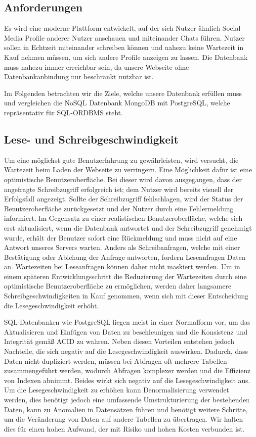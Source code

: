 \subsection{Anforderungen}
Es wird eine moderne Plattform entwickelt, auf der sich Nutzer ähnlich Social Media Profile anderer Nutzer anschauen und miteinander Chats führen. Nutzer sollen in Echtzeit miteinander schreiben können und nahezu keine Wartezeit in Kauf nehmen müssen, um sich andere Profile anzeigen zu lassen. Die Datenbank muss nahezu immer erreichbar sein, da unsere Webseite ohne Datenbankanbindung nur beschränkt nutzbar ist.


Im Folgenden betrachten wir die Ziele, welche unsere Datenbank erfüllen muss und vergleichen die NoSQL Datenbank MongoDB mit PostgreSQL, welche repräsentativ für SQL-ORDBMS steht.

\subsection{Lese- und Schreibgeschwindigkeit}
Um eine möglichst gute Benutzerfahrung zu gewährleisten, wird versucht, die Wartezeit beim Laden der Webseite zu verringern. 
Eine Möglichkeit dafür ist eine optimistische Benutzeroberfläche. Bei dieser wird davon ausgegangen, dass der angefragte Schreibzugriff erfolgreich ist; dem Nutzer wird bereits visuell der Erfolgsfall angezeigt. Sollte der Schreibzugriff fehlschlagen,  wird der Status der Benutzeroberfläche zurückgesetzt und der Nutzer durch eine Fehlermeldung informiert. Im Gegensatz zu einer realistischen Benutzeroberfläche, welche sich erst aktualisiert, wenn die Datenbank antwortet und der Schreibzugriff genehmigt wurde, erhält der Benutzer sofort eine Rückmeldung und muss nicht auf eine Antwort unseres Servers warten.
Anders als Schreibanfragen, welche mit einer Bestätigung oder Ablehung der Anfrage antworten, fordern Leseanfragen Daten an. Wartezeiten bei Leseanfragen können daher nicht maskiert werden.
Um in einem späteren Entwicklungsschritt die Reduzierung der Wartezeiten durch eine optimistische Benutzeroberfläche zu ermöglichen, werden daher langsamere Schreibgeschwindigkeiten in Kauf genommen, wenn sich mit dieser Entscheidung die Lesegeschwindigkeit erhöht.

SQL-Datenbanken wie PostgreSQL liegen meist in einer Normalform vor, um das Aktualisieren und Einfügen von Daten zu beschleunigen und die Konsistenz und Integrität gemäß ACID zu wahren. Neben diesen Vorteilen entstehen jedoch Nachteile, die sich negativ auf die Lesegeschwindigkeit auswirken. Dadurch, dass Daten nicht dupliziert werden, müssen bei Abfragen oft mehrere Tabellen zusammengeführt werden, wodurch Abfragen komplexer werden und die Effizienz von Indexen abnimmt. Beides wirkt sich negativ auf die Lesegeschwindigkeit aus. Um die Lesegeschwindigkeit zu erhöhen kann Denormalisierung verwendet werden, dies benötigt jedoch eine umfassende Umstrukturierung der bestehenden Daten, kann zu Anomalien in Datensätzen führen und benötigt weitere Schritte, um die Veränderung von Daten auf andere Tabellen zu übertragen. Wir halten dies für einen hohen Aufwand, der mit Risiko und hohen Kosten verbunden ist. 

